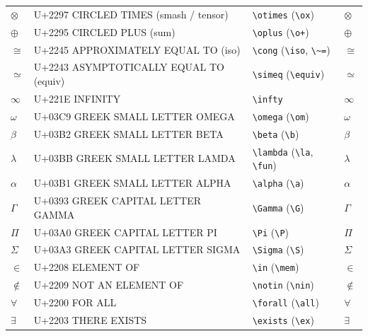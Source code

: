 \documentclass[10pt]{article}
\newcommand{\li}[1]{\texttt{\textbackslash #1}}      %
\newcommand{\uni}[1]{$#1$}                            %
\begin{document}
{\begin{longtable}{@{}p{1.1cm}p{6.9cm}p{5.6cm}p{1.4cm}@{}}
\uni{\otimes}     & U+2297 CIRCLED TIMES (smash / tensor)   & \li{otimes} \; (\li{ox})                    & \uni{\otimes} \\
\uni{\oplus}      & U+2295 CIRCLED PLUS (sum)               & \li{oplus} \; (\texttt{\textbackslash o+})  & \uni{\oplus} \\
\uni{\cong}       & U+2245 APPROXIMATELY EQUAL TO (iso)     & \li{cong} \; (\li{iso}, \texttt{\textbackslash\textasciitilde=}) & \uni{\cong} \\
\uni{\simeq}      & U+2243 ASYMPTOTICALLY EQUAL TO (equiv)  & \li{simeq} \; (\li{equiv})                  & \uni{\simeq} \\
\uni{\infty}      & U+221E INFINITY                         & \li{infty}                                  & \uni{\infty} \\
\uni{\omega}      & U+03C9 GREEK SMALL LETTER OMEGA         & \li{omega} \; (\li{om})                     & \uni{\omega} \\
\uni{\beta}       & U+03B2 GREEK SMALL LETTER BETA          & \li{beta} \; (\li{b})                       & \uni{\beta} \\
\uni{\lambda}     & U+03BB GREEK SMALL LETTER LAMDA         & \li{lambda} \; (\li{la}, \li{fun})          & \uni{\lambda} \\
\uni{\alpha}      & U+03B1 GREEK SMALL LETTER ALPHA         & \li{alpha} \; (\li{a})                      & \uni{\alpha} \\
\uni{\Gamma}      & U+0393 GREEK CAPITAL LETTER GAMMA       & \li{Gamma} \; (\li{G})                      & \uni{\Gamma} \\
\uni{\Pi}         & U+03A0 GREEK CAPITAL LETTER PI          & \li{Pi} \; (\li{P})                         & \uni{\Pi} \\
\uni{\Sigma}      & U+03A3 GREEK CAPITAL LETTER SIGMA       & \li{Sigma} \; (\li{S})                      & \uni{\Sigma} \\
\uni{\in}         & U+2208 ELEMENT OF                       & \li{in} \; (\li{mem})                       & \uni{\in} \\
\uni{\notin}      & U+2209 NOT AN ELEMENT OF                & \li{notin} \; (\li{nin})                    & \uni{\notin} \\
\uni{\forall}     & U+2200 FOR ALL                         & \li{forall} \; (\li{all})                   & \uni{\forall} \\
\uni{\exists}     & U+2203 THERE EXISTS                     & \li{exists} \; (\li{ex})                    & \uni{\exists} \\

\end{longtable}}
\end{document}
